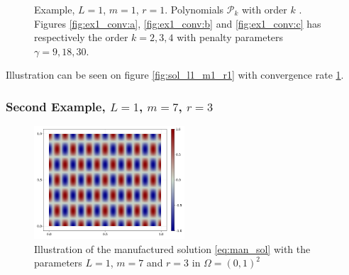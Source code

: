 \begin{figure}
    \caption{ Example, $L=1$, $m=1$, $r=1$. Polynomials $\mathcal{P}_{k} $ with order $k$ . Figures \ref{fig:ex1_conv:a}, \ref{fig:ex1_conv:b} and \ref{fig:ex1_conv:c} has respectively the order $k=2,3, 4$ with penalty parameters $\gamma = 9,18,30 $.  }
    \label{fig:ex1_conv}
\end{figure}

Illustration can be seen on figure \ref{fig:sol_l1_m1_r1} with convergence rate \ref{fig:ex1_conv}.


\subsubsection{Second Example, $L=1$, $m=7$, $r=3$}%
\label{sub:second_example}

\begin{figure}[tbh!]
    \centering
    \includegraphics[width=0.5\textwidth]{figures/model/l_1.0_m_7_r_3n_100_sol.png}
    \caption{Illustration of the manufactured solution \eqref{eq:man_sol}   with the parameters $L=1$, $m=7$ and $r=3$ in $\Omega = (0,1)^2$}
    \label{fig:sol_l1_m7_r3}
\end{figure}

